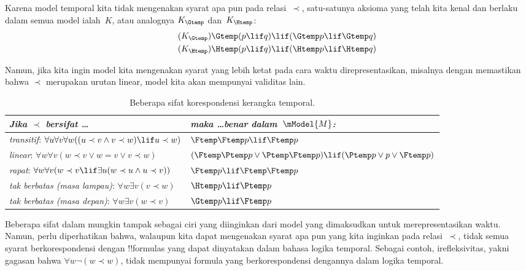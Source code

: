 \documentclass[../../../include/open-logic-section]{subfiles}
\begin{document}


Karena model temporal kita tidak mengenakan syarat apa pun pada
relasi~$\prec$, satu-satunya aksioma yang telah kita kenal dan berlaku dalam
semua model ialah~$K$, atau analognya $K_{\Gtemp}$ dan~$K_{\Htemp}$:
\begin{align*}
\tag{$K_{\Gtemp}$}  \Gtemp (p \lif q) & \lif (\Gtemp p \lif \Gtemp q)\\
\tag{$K_{\Htemp}$}  \Htemp (p \lif q) & \lif (\Htemp p \lif \Htemp q)
\end{align*}

Namun, jika kita ingin model kita mengenakan syarat yang lebih ketat pada
cara waktu direpresentasikan, misalnya dengan memastikan bahwa $\prec$
merupakan urutan linear, model kita akan mempunyai validitas lain.

\begin{table}[t]
  \begin{tabular}{| p{} || p{} |}
    \hline
    {\emph{Jika $\prec$ bersifat \dots}} & {\emph{maka \dots benar
    dalam~$\mModel{M}$:}} \\
    \hline \hline
    \emph{transitif}: \newline
    $\forall u \forall v \forall w ((u \prec v \land v \prec w) \lif u \prec w)$ &
    $\Ftemp \Ftemp p \lif \Ftemp p$  \\
    \hline
    \emph{linear}: \newline
    $\forall w \forall v (w \prec v \lor w = v \lor v \prec w)$ &
    $(\Ftemp \Ptemp p \lor \Ptemp \Ftemp p) \lif
    (\Ptemp p \lor p \lor \Ftemp p)$\\
    \hline
    \emph{rapat}: \newline
    $\forall w \forall v (w \prec v \lif \exists u(w \prec u \land u \prec v))$ &
    $\Ftemp p \lif \Ftemp \Ftemp p$ \\
    \hline
    \emph{tak berbatas (masa lampau)}: \newline
    $\forall w \exists v( v \prec w)$ &
    $\Htemp p \lif \Ptemp p$ \\
    \hline
    \emph{tak berbatas (masa depan)}: \newline
    $\forall w \exists v( w \prec v)$ &
    $\Gtemp p \lif \Ftemp p$ \\
    \hline
  \end{tabular}
  \caption{Beberapa sifat korespondensi kerangka temporal.}
\end{table}

Beberapa sifat dalam  mungkin tampak sebagai ciri
yang diinginkan dari model yang dimaksudkan untuk merepresentasikan waktu.
Namun, perlu diperhatikan bahwa, walaupun kita dapat mengenakan syarat apa pun
yang kita inginkan pada relasi~$\prec$, tidak semua syarat berkorespondensi
dengan !!{formula}s yang dapat dinyatakan dalam bahasa logika temporal.
Sebagai contoh, irefleksivitas, yakni gagasan bahwa
$\forall w\lnot(w\prec w)$, tidak mempunyai formula yang berkorespondensi
dengannya dalam logika temporal.
\end{document}
